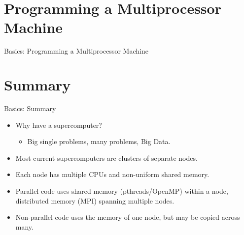 \section{Programming a Multiprocessor Machine}
\begin{frame}{Basics: Programming a Multiprocessor Machine}
\end{frame}

\section{Summary}

\begin{frame}{Basics: Summary}
  \begin{itemize}
  \item<1->{\alert{Why have a supercomputer?}}
  \begin{itemize}\item<2->{Big single problems, many problems, Big Data.}\end{itemize}
  \item<3->{Most current supercomputers are \alert{clusters} of separate \alert{nodes}.}
  \item<4->{Each node has \alert{multiple CPUs} and \alert{non-uniform shared memory}.}
  \item<5->{\alert{Parallel} code uses shared memory (\alert{pthreads/OpenMP}) within a node, distributed memory (\alert{MPI}) spanning multiple nodes.}
  \item<6->{\alert{Non-parallel} code uses the memory of one node, but may be copied across many.}
  \end{itemize}
  
\end{frame}


